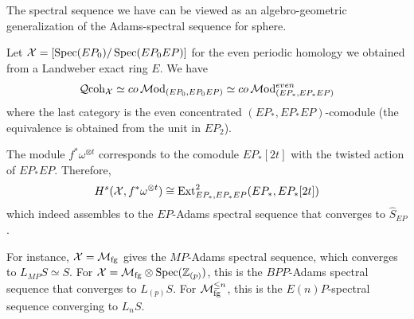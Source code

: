 The spectral sequence we have can be viewed as an algebro-geometric generalization of the Adams-spectral sequence for sphere.

\begin{remark}
Let $\operatorname{\mathcal{X}}=[\operatorname{\mathrm{Spec}}(EP_0)/\operatorname{\mathrm{Spec}}(EP_0EP)]$ for the even periodic homology we obtained from a Landweber exact ring $E$. We have 
\[
\operatorname{\mathcal{Q}coh}_{\operatorname{\mathcal{X}}}\simeq co\operatorname{\mathcal{M}od}_{(EP_0, EP_0EP)}\simeq co\operatorname{\mathcal{M}od}_{(EP_*, EP_*EP)}^{even}
\]where the last category is the even concentrated $(EP_*, EP_*EP)$-comodule (the equivalence is obtained from the unit in $EP_2$).

The module $f^*\omega^{\otimes t}$ corresponds to the comodule $EP_*[2t]$ with the twisted action of $EP_*EP$. Therefore,
\[
    H^s(\operatorname{\mathcal{X}}, f^*\omega^{\otimes t})\cong \mathrm{Ext}_{EP_*, EP_*EP}^2(EP_*, EP_*[2t])
\]
which indeed assembles to the $EP$-Adams spectral sequence that converges to $\hat{S}_{EP}$.

For instance, $\operatorname{\mathcal{X}}=\mathcal{M}_{\mathrm{fg}}$ gives the $MP$-Adams spectral sequence, which converges to $L_{MP}S\simeq S$. For $\operatorname{\mathcal{X}}=\mathcal{M}_{\mathrm{fg}}\otimes \operatorname{\mathrm{Spec}}(\mathbb{Z}_{(p)})$, 
this is the $BPP$-Adams spectral sequence that converges to $L_{(p)}S$. For $\mathcal{M}_{\mathrm{fg}}^{\leq n}$, this is the $E(n)P$-spectral sequence converging to $L_n S$.
\end{remark}